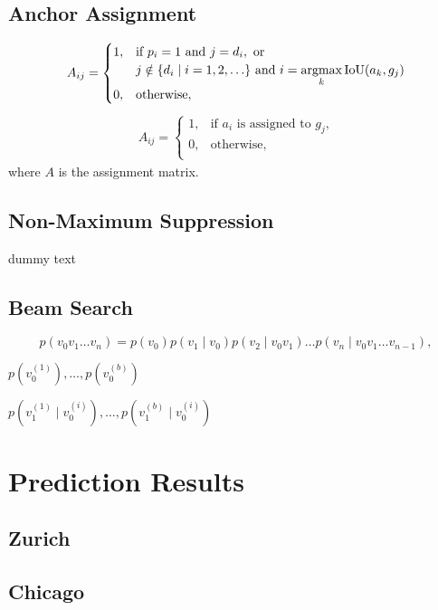 \section{Anchor Assignment}\label{app:assignanchor}
\begin{equation}
\begin{aligned}
	A_{ij} = \begin{cases}
		1, & \text{if } p_i = 1 \text{ and } j = d_i, \text{ or }\\
		& j \notin \{d_i \mid i = 1,2,\ldots\} \text{ and } i = \operatorname*{argmax}\limits_{k} \text{IoU}(a_k, g_j) \\
		0, & \text{otherwise},\\
	\end{cases}
\end{aligned}
\end{equation}
\begin{equation}
\begin{aligned}
	A_{ij} = \begin{cases}
		1, & \text{if $a_i$ is assigned to $g_j$,}\\
		0, & \text{otherwise},\\
	\end{cases}
\end{aligned}
\end{equation}
where $A$ is the assignment matrix. 

\section{Non-Maximum Suppression}\label{app:nms}
dummy text


\section{Beam Search}\label{app:bmsrch}

\begin{equation}
	p(v_0v_1 \ldots v_n) = p(v_0)p(v_1 \mid v_0)p(v_2 \mid v_0v_1) \ldots p(v_n \mid v_0v_1 \ldots v_{n-1}),
\end{equation}

$p(v_0^{(1)}),\ldots,p(v_0^{(b)})$

$p(v_1^{(1)} \mid v_0^{(i)}),\ldots,p(v_1^{(b)} \mid v_0^{(i)})$

\chapter{Prediction Results}
\section{Zurich}\label{app:predzh}
\section{Chicago}\label{app:predch}
